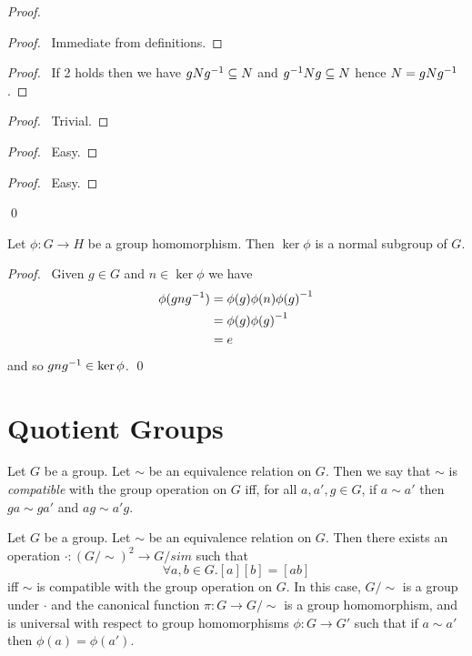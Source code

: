 \begin{proof}
\pf
{}
\begin{proof}
\pf\ Immediate from definitions.
\end{proof}
\begin{proof}
	\pf\ If 2 holds then we have $gN{g}^{-1} \subseteq N$ and ${g}^{-1}Ng \subseteq N$ hence $N = gN{g}^{-1}$.
\end{proof}
\begin{proof}
\pf\ Trivial.
\end{proof}
\begin{proof}
\pf\ Easy.
\end{proof}
\begin{proof}
\pf\ Easy.
\end{proof}
\qed
\end{proof}

\begin{prop}
\label{prop:kernel-normal}
Let $\phi : G \rightarrow H$ be a group homomorphism. Then $\ker \phi$ is a normal subgroup of $G$.
\end{prop}

\begin{proof}
\pf\ Given $g \in G$ and $n \in \ker \phi$ we have
\begin{align*}
\phi(gn{g}^{-1}) & = \phi(g) \phi(n) {\phi(g)}^{-1} \\
& = \phi(g) {\phi(g)}^{-1} \\
& = e
\end{align*}
and so $gn{g}^{-1} \in \ker \phi$. \qed
\end{proof}

\section{Quotient Groups}

\begin{df}
Let $G$ be a group. Let $\sim$ be an equivalence relation on $G$. Then we say that $\sim$ is \emph{compatible} with the group operation on $G$ iff, for all $a, a', g \in G$, if $a \sim a'$ then $ga \sim ga'$ and $ag \sim a'g$.
\end{df}

\begin{prop}
Let $G$ be a group. Let $\sim$ be an equivalence relation on $G$. Then there exists an operation $\cdot : (G/\sim)^2 \rightarrow G/sim$ such that
\[ \forall a,b \in G. [a][b] = [ab] \]
iff $\sim$ is compatible with the group operation on $G$. In this case, $G/\sim$ is a group under $\cdot$ and the canonical function $\pi : G \rightarrow G / \sim$ is a group homomorphism, and is universal with respect to group homomorphisms $\phi : G \rightarrow G'$ such that if $a \sim a'$ then $\phi(a) = \phi(a')$.
\end{prop}

